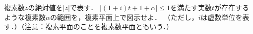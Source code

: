 \documentclass[../../main.tex]{subfiles}
\begin{document}
複素数$z$の絶対値を$|z|$で表す．
$|(1+i)t+1+\alpha|\le 1$を満たす実数$t$が存在するような複素数$\alpha$の範囲を，複素平面上で図示せよ．
（ただし，$i$は虚数単位を表す．）（注意：複素平面のことを複素数平面ともいう．）
\end{document}
